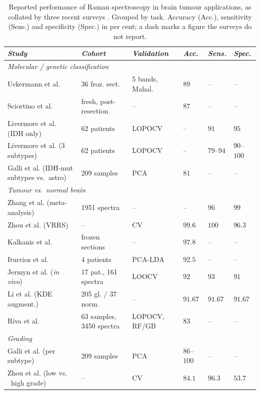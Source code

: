 \begin{table}[htp]
\centering
\scriptsize
\caption{Reported performance of Raman spectroscopy in brain tumour applications, as collated
by three recent surveys \cite{Hollon2021, Murugappan2023, stupak2025raman}.
Grouped by task. Accuracy (Acc.), sensitivity (Sens.) and specificity (Spec.) in per cent;
a dash marks a figure the surveys do not report.}
\label{tab:rs_brain_performance}
\begin{tabular}{@{}p{3.3cm}p{3.1cm}p{2.2cm}>{\centering\arraybackslash}p{1.3cm}>{\centering\arraybackslash}p{1.2cm}>{\centering\arraybackslash}p{1.2cm}@{}}
\toprule
\emph{Study} & \emph{Cohort} & \emph{Validation} & \emph{Acc.} & \emph{Sens.} & \emph{Spec.}\\
\midrule
\multicolumn{6}{l}{\emph{Molecular / genetic classification}}\\
\midrule
Uckermann et al. & 36 froz. sect. & 5 bands, Mahal. & $89$ & -- & --\\
Sciortino et al. & fresh, post-resection & -- & $87$ & -- & --\\
Livermore et al. (IDH only) & 62 patients & LOPOCV & -- & $91$ & $95$\\
Livermore et al. (3 subtypes) & 62 patients & LOPOCV & -- & $79$--$94$ & $90$--$100$\\
Galli et al. (IDH-mut subtypes vs.\ astro) & 209 samples & PCA & $81$ & -- & --\\
\midrule
\multicolumn{6}{l}{\emph{Tumour vs.\ normal brain}}\\
\midrule
Zhang et al. (meta-analysis) & 1951 spectra & -- & -- & $96$ & $99$\\
Zhou et al. (VRRS) & -- & CV & $99.6$ & $100$ & $96.3$\\
Kalkanis et al. & frozen sections & -- & $97.8$ & -- & --\\
Iturrioz et al. & 4 patients & PCA-LDA & $92.5$ & -- & --\\
Jermyn et al. (\emph{in vivo}) & 17 pat., 161 spectra & LOOCV & $92$ & $93$ & $91$\\
Li et al. (KDE augment.) & 205 gl. / 37 norm. & -- & $91.67$ & $91.67$ & $91.67$\\
Riva et al. & 63 samples, 3450 spectra & LOPOCV, RF/GB & $83$ & -- & --\\
\midrule
\multicolumn{6}{l}{\emph{Grading}}\\
\midrule
Galli et al. (per subtype) & 209 samples & PCA & $86$--$100$ & -- & --\\
Zhou et al. (low vs.\,\ high grade) & -- & CV & $84.1$ & $96.3$ & $53.7$\\

\end{tabular}
\end{table}

